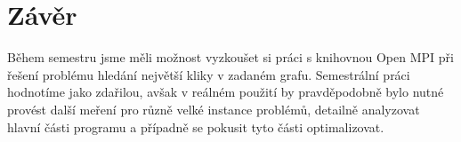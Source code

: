 \documentclass[12pt]{article}
\begin{document}
\section{Závěr}

Během semestru jsme měli možnost vyzkoušet si práci s knihovnou Open MPI
při řešení problému hledání největší kliky v zadaném grafu.
Semestrální práci hodnotíme jako zdařilou, avšak v reálném použití
by pravděpodobně bylo nutné provést další meření pro různě velké instance problémů, 
detailně analyzovat hlavní části programu a případně se pokusit tyto části optimalizovat.

%
\end{document}
